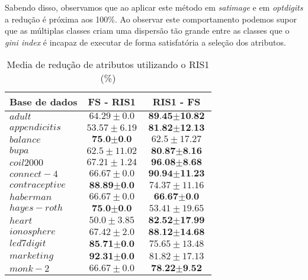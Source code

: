 \documentclass[a4paper, 12pt]{article}
\begin{document}
Sabendo disso, observamos que ao aplicar este método em \textit{satimage} e em \textit{optdigits} a redução é próxima aos 100\%. Ao observar este comportamento podemos supor que as múltiplas classes criam uma dispersão tão grande entre as classes que o \textit{gini index} é incapaz de executar de forma satisfatória a seleção dos atributos.

\begin{table}[h!]
  \begin{center}
    \caption{Media de redução de atributos utilizando o RIS1 (\%)}
    \label{tab:table3}
    \begin{tabular}{l|c|c}
      \textbf{Base de dados} &\textbf{FS - RIS1} & \textbf{RIS1 - FS}\\
        \hline
        $adult$ & $64.29 \pm 0.0$  & $\textbf{89.45} \pm \textbf{10.82}$ \\
        \hline
        $appendicitis$ & $53.57 \pm 6.19$  & $\textbf{81.82} \pm \textbf{12.13}$ \\
        \hline
        $balance$ & $\textbf{75.0} \pm \textbf{0.0}$  & $62.5 \pm 17.27$ \\
        \hline
        $bupa$ & $62.5 \pm 11.02$  & $\textbf{80.87} \pm \textbf{8.16}$ \\
        \hline
        $coil2000$ & $67.21 \pm 1.24$  & $\textbf{96.08} \pm \textbf{8.68}$ \\
        \hline
        $connect-4$ & $66.67 \pm 0.0$  & $\textbf{90.94} \pm \textbf{11.23}$ \\
        \hline
        $contraceptive$ & $\textbf{88.89} \pm \textbf{0.0}$  & $74.37 \pm 11.16$ \\
        \hline
        $haberman$ & $66.67 \pm 0.0$  & $\textbf{66.67} \pm \textbf{0.0}$ \\
        \hline
        $hayes-roth$ & $\textbf{75.0} \pm \textbf{0.0}$  & $53.41 \pm 19.65$ \\
        \hline
        $heart$ & $50.0 \pm 3.85$  & $\textbf{82.52} \pm \textbf{17.99}$ \\
        \hline
        $ionosphere$ & $67.42 \pm 2.0$  & $\textbf{88.12} \pm \textbf{14.68}$ \\
        \hline
        $led7digit$ & $\textbf{85.71} \pm \textbf{0.0}$  & $75.65 \pm 13.48$ \\
        \hline
        $marketing$ & $\textbf{92.31} \pm \textbf{0.0}$  & $81.82 \pm 17.13$ \\
        \hline
        $monk-2$ & $66.67 \pm 0.0$  & $\textbf{78.22} \pm \textbf{9.52}$ \\

\end{tabular}
\end{center}
\end{table}
\end{document}

